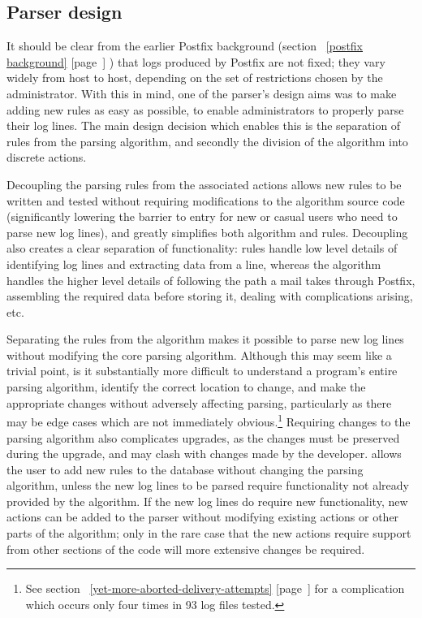 \documentclass[a4paper,12pt,draft]{article}
\newcommand{\parsername}{\PLP{}}
\newcommand{\refwithpage}[1]{%
    \empty{}\ref{#1} [page~\pageref{#1}]%
}
\begin{document}
\subsection{Parser design}

\label{parser design}

It should be clear from the earlier Postfix background
(section~\refwithpage{postfix background}) that logs produced by Postfix
are not fixed; they vary widely from host to host, depending on the set of
restrictions chosen by the administrator.  With this in mind, one of the
parser's design aims was to make adding new rules as easy as possible, to
enable administrators to properly parse their log lines.  The main design
decision which enables this is the separation of rules from the parsing
algorithm, and secondly the division of the algorithm into discrete
actions.

\label{why separate rules and algorithm}

Decoupling the parsing rules from the associated actions allows new rules
to be written and tested without requiring modifications to the algorithm
source code (significantly lowering the barrier to entry for new or casual
users who need to parse new log lines), and greatly simplifies both
algorithm and rules.  Decoupling also creates a clear separation of
functionality: rules handle low level details of identifying log lines and
extracting data from a line, whereas the algorithm handles the higher level
details of following the path a mail takes through Postfix, assembling the
required data before storing it, dealing with complications arising, etc.

Separating the rules from the algorithm makes it possible to parse new log
lines without modifying the core parsing algorithm.  Although this may seem
like a trivial point, is it substantially more difficult to understand a
program's entire parsing algorithm, identify the correct location to
change, and make the appropriate changes without adversely affecting
parsing, particularly as there may be edge cases which are not immediately
obvious.\footnote{See
section~\refwithpage{yet-more-aborted-delivery-attempts} for a complication
which occurs only four times in 93 log files tested.}  Requiring changes to
the parsing algorithm also complicates upgrades, as the changes must be
preserved during the upgrade, and may clash with changes made by the
developer.  \parsername{} allows the user to add new rules to the database
without changing the parsing algorithm, unless the new log lines to be
parsed require functionality not already provided by the algorithm.  If the
new log lines do require new functionality, new actions can be added to the
parser without modifying existing actions or other parts of the algorithm;
only in the rare case that the new actions require support from other
sections of the code will more extensive changes be required.
\end{document}
